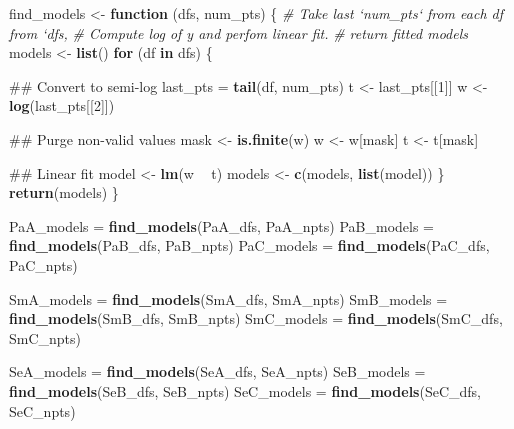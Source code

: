 \documentclass[]{article}
\newenvironment{Shaded}{\begin{snugshade}}{\end{snugshade}}
\newcommand{\KeywordTok}[1]{\textcolor[rgb]{0.13,0.29,0.53}{\textbf{#1}}}
\newcommand{\DecValTok}[1]{\textcolor[rgb]{0.00,0.00,0.81}{#1}}
\newcommand{\StringTok}[1]{\textcolor[rgb]{0.31,0.60,0.02}{#1}}
\newcommand{\CommentTok}[1]{\textcolor[rgb]{0.56,0.35,0.01}{\textit{#1}}}
\newcommand{\ControlFlowTok}[1]{\textcolor[rgb]{0.13,0.29,0.53}{\textbf{#1}}}
\newcommand{\OperatorTok}[1]{\textcolor[rgb]{0.81,0.36,0.00}{\textbf{#1}}}
\newcommand{\NormalTok}[1]{#1}
\begin{document}
\begin{Shaded}
\begin{Highlighting}[]
\NormalTok{find_models <-}\StringTok{ }\ControlFlowTok{function}\NormalTok{ (dfs, num_pts) \{}
  \CommentTok{# Take last `num_pts` from each df from `dfs, }
  \CommentTok{# Compute log of y and perfom linear fit.}
  \CommentTok{# return fitted models}
\NormalTok{  models <-}\StringTok{ }\KeywordTok{list}\NormalTok{()}
  \ControlFlowTok{for}\NormalTok{ (df }\ControlFlowTok{in}\NormalTok{ dfs) \{}
    
\NormalTok{    ## Convert to semi-log}
\NormalTok{    last_pts =}\StringTok{ }\KeywordTok{tail}\NormalTok{(df, num_pts)}
\NormalTok{    t <-}\StringTok{ }\NormalTok{last_pts[[}\DecValTok{1}\NormalTok{]]}
\NormalTok{    w <-}\StringTok{ }\KeywordTok{log}\NormalTok{(last_pts[[}\DecValTok{2}\NormalTok{]])}
    
\NormalTok{    ## Purge non-valid values}
\NormalTok{    mask <-}\StringTok{ }\KeywordTok{is.finite}\NormalTok{(w)}
\NormalTok{    w <-}\StringTok{ }\NormalTok{w[mask]  }
\NormalTok{    t <-}\StringTok{ }\NormalTok{t[mask]}
    
\NormalTok{    ## Linear fit}
\NormalTok{    model <-}\StringTok{ }\KeywordTok{lm}\NormalTok{(w }\OperatorTok{~}\StringTok{ }\NormalTok{t)}
\NormalTok{    models <-}\StringTok{ }\KeywordTok{c}\NormalTok{(models, }\KeywordTok{list}\NormalTok{(model))}
\NormalTok{  \}}
  \KeywordTok{return}\NormalTok{(models)}
\NormalTok{\}}

\NormalTok{PaA_models =}\StringTok{ }\KeywordTok{find_models}\NormalTok{(PaA_dfs, PaA_npts)}
\NormalTok{PaB_models =}\StringTok{ }\KeywordTok{find_models}\NormalTok{(PaB_dfs, PaB_npts)}
\NormalTok{PaC_models =}\StringTok{ }\KeywordTok{find_models}\NormalTok{(PaC_dfs, PaC_npts)}

\NormalTok{SmA_models =}\StringTok{ }\KeywordTok{find_models}\NormalTok{(SmA_dfs, SmA_npts)}
\NormalTok{SmB_models =}\StringTok{ }\KeywordTok{find_models}\NormalTok{(SmB_dfs, SmB_npts)}
\NormalTok{SmC_models =}\StringTok{ }\KeywordTok{find_models}\NormalTok{(SmC_dfs, SmC_npts)}

\NormalTok{SeA_models =}\StringTok{ }\KeywordTok{find_models}\NormalTok{(SeA_dfs, SeA_npts)}
\NormalTok{SeB_models =}\StringTok{ }\KeywordTok{find_models}\NormalTok{(SeB_dfs, SeB_npts)}
\NormalTok{SeC_models =}\StringTok{ }\KeywordTok{find_models}\NormalTok{(SeC_dfs, SeC_npts)}
\end{Highlighting}
\end{Shaded}
\end{document}
